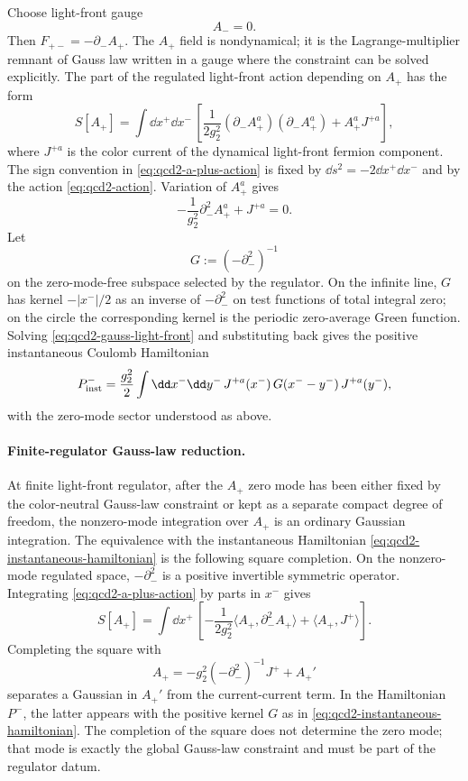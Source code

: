 Choose light-front gauge
\[
  A_-=0 .
\]
Then \(F_{+-}=-\partial_-A_+\).  The \(A_+\) field is nondynamical; it is the
Lagrange-multiplier remnant of Gauss law written in a gauge where the
constraint can be solved explicitly.  The part of the regulated light-front
action depending on \(A_+\) has the form
\begin{equation}
  S[A_+]
  =
  \int\dd x^+\dd x^-\,
  \left[
    \frac1{2g_2^2}(\partial_-A_+^a)(\partial_-A_+^a)
    +A_+^aJ^{+a}
  \right],
  \label{eq:qcd2-a-plus-action}
\end{equation}
where \(J^{+a}\) is the color current of the dynamical light-front fermion
component.  The sign convention in \eqref{eq:qcd2-a-plus-action} is fixed by
\(\dd s^2=-2\dd x^+\dd x^-\) and by the action
\eqref{eq:qcd2-action}.  Variation of \(A_+^a\) gives
\begin{equation}
  -\frac1{g_2^2}\partial_-^2A_+^a+J^{+a}=0 .
  \label{eq:qcd2-gauss-light-front}
\end{equation}
Let
\[
  G:=(-\partial_-^2)^{-1}
\]
on the zero-mode-free subspace selected by the regulator.  On the infinite
line, \(G\) has kernel \(-|x^-|/2\) as an inverse of \(-\partial_-^2\) on
test functions of total integral zero; on the circle the corresponding
kernel is the periodic zero-average Green function.  Solving
\eqref{eq:qcd2-gauss-light-front} and substituting back gives the positive
instantaneous Coulomb Hamiltonian
\begin{equation}
  P^-_{\rm inst}
  =
  \frac{g_2^2}{2}
  \int\dd x^-\dd y^-\,
  J^{+a}(x^-)\,G(x^--y^-)\,J^{+a}(y^-),
  \label{eq:qcd2-instantaneous-hamiltonian}
\end{equation}
with the zero-mode sector understood as above.

\paragraph{Finite-regulator Gauss-law reduction.}
At finite light-front regulator, after the \(A_+\) zero mode has been either
fixed by the color-neutral Gauss-law constraint or kept as a separate compact
degree of freedom, the nonzero-mode integration over \(A_+\) is an ordinary
Gaussian integration.  The equivalence with the instantaneous Hamiltonian
\eqref{eq:qcd2-instantaneous-hamiltonian} is the following square completion.
On the nonzero-mode regulated space, \(-\partial_-^2\) is a positive
invertible symmetric operator.  Integrating \eqref{eq:qcd2-a-plus-action} by
parts in \(x^-\) gives
\[
  S[A_+]
  =
  \int\dd x^+\,
  \left[
    -\frac1{2g_2^2}\langle A_+,\partial_-^2A_+\rangle
    +\langle A_+,J^+\rangle
  \right].
\]
Completing the square with
\[
  A_+=-g_2^2(-\partial_-^2)^{-1}J^+ + A_+'
\]
separates a Gaussian in \(A_+'\) from the current-current term.  In the
Hamiltonian \(P^-\), the latter appears with the positive kernel \(G\) as in
\eqref{eq:qcd2-instantaneous-hamiltonian}.  The completion of the square does
not determine the zero mode; that mode is exactly the global Gauss-law
constraint and must be part of the regulator datum.

